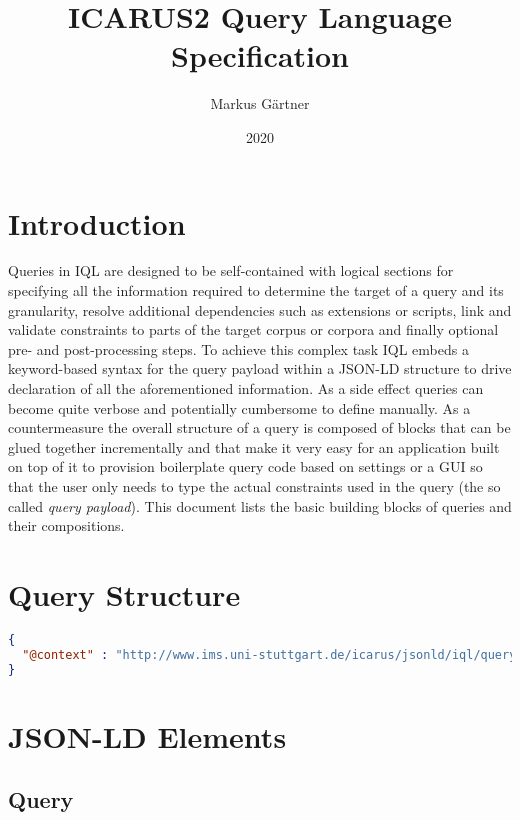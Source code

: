 \documentclass[11pt]{article}
\title{ICARUS2 Query Language Specification}
\author{Markus Gärtner}
\date{2020}
\begin{document}
\maketitle

\tableofcontents

\section{Introduction}
\label{sec:intro}

Queries in IQL are designed to be self-contained with logical sections for specifying all the information required to determine the target of a query and its granularity, resolve additional dependencies such as extensions or scripts, link and validate constraints to parts of the target corpus or corpora and finally optional pre- and post-processing steps. To achieve this complex task IQL embeds a keyword-based syntax for the query payload within a JSON-LD structure to drive declaration of all the aforementioned information. As a side effect queries can become quite verbose and potentially cumbersome to define manually. As a countermeasure the overall structure of a query is composed of blocks that can be glued together incrementally and that make it very easy for an application built on top of it to provision boilerplate query code based on settings or a GUI so that the user only needs to type the actual constraints used in the query (the so called \textit{query payload}). This document lists the basic building blocks of queries and their compositions.

\section{Query Structure}
\label{sec:query-structure}

\begin{lstlisting}[language=json]
{
  "@context" : "http://www.ims.uni-stuttgart.de/icarus/jsonld/iql/query" 
}
\end{lstlisting}


\section{JSON-LD Elements}
\label{sec:elements}

\subsection{Query}
\label{sec:json-ld-query}
\end{document}
